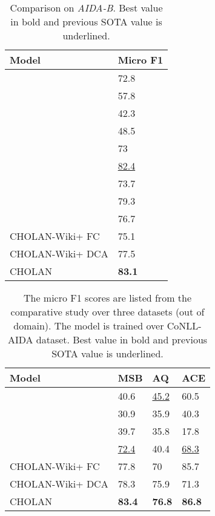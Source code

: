 \documentclass[11pt,a4paper]{article}
\begin{document}
\begin{table}[ht!]
    \centering
    \begin{tabular}{p{4cm}p{1.6cm}}
\toprule
     \textbf{Model} & \textbf{Micro F1}\\
\midrule
     \citealt{DBLP:conf/emnlp/HoffartYBFPSTTW11}   &72.8\\
      \citealt{MendesJGB11}   &57.8\\
      \citealt{steinmetz2013semantic}   &42.3\\
      \citealt{moro2014entity}  &48.5\\
     \citealt{piccinno2014tagme} & 73 \\
     \citealt{kolitsas2018end}& \underline{82.4} \\
     \citealt{peters2019knowledge} & 73.7\\
     \citealt{broscheit2019investigating} & 79.3 \\
     \citealt{evry2020empirical} & 76.7 \\
\midrule
     CHOLAN-Wiki+ FC & 75.1\\
     CHOLAN-Wiki+ DCA&  77.5\\
     CHOLAN & \textbf{83.1} \\
     \bottomrule
    
\end{tabular}
\caption{Comparison on \textit{AIDA-B}. Best value in bold and previous SOTA value is underlined.}
\label{tab:aidaB}
\vspace{-2mm}
\end{table}
\begin{table}[!htp]
    \centering
    \begin{tabular}{p{3.5cm}p{0.65cm}p{0.7cm}p{0.65cm} }
\toprule
     \textbf{Model} & \textbf{MSB} & \textbf{AQ} & \textbf{ACE}\\
\midrule
      \citealt{MendesJGB11}  & 40.6    &\underline{45.2} &60.5\\
      \citealt{steinmetz2013semantic}  & 30.9    &35.9 &40.3\\
      \citealt{moro2014entity}  & 39.7   &35.8 &17.8\\
      \citealt{kolitsas2018end}  & \underline{72.4} &40.4 & \underline{68.3}\\
\midrule
    CHOLAN-Wiki+ FC  &   77.8  & 70 &85.7\\
     CHOLAN-Wiki+ DCA &   78.3 & 75.9 &71.3\\
      CHOLAN  &  \textbf{83.4} & \textbf{76.8} &\textbf{86.8}\\
\bottomrule
    \end{tabular}
    \caption{The micro F1 scores are listed from the comparative study over three datasets (out of domain). The model is trained over CoNLL-AIDA dataset. Best value in bold and previous SOTA value is underlined.}
    \label{tab:msb}
    \vspace{-2mm}
\end{table}
\end{document}
